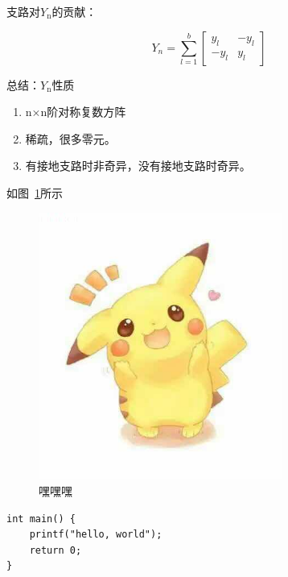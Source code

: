 \documentclass{ctexart} %
\begin{document}
支路对$Y_{\mathrm{n}}$的贡献：

\begin{equation}
Y_{n}=\sum_{l=1}^{b} \left[ \begin{array}{cc}{y_{l}} & {-y_{l}} \\ {-y_{l}} & {y_{l}}\end{array}\right]
\end{equation}

总结：$Y_{\mathrm{n}}$性质
\begin{enumerate}
\item n×n阶对称复数方阵
\item 稀疏，很多零元。
\item 有接地支路时非奇异，没有接地支路时奇异。
\end{enumerate}

如图~\ref{1}所示
\begin{figure}[htbp]
\small
\centering
\includegraphics[width=8cm]{1.jpg}
\caption{嘿嘿嘿} 
\label{1}
\end{figure}

\begin{verbatim}
int main() {
    printf("hello, world");
    return 0;
}
\end{verbatim}





\end{document}
